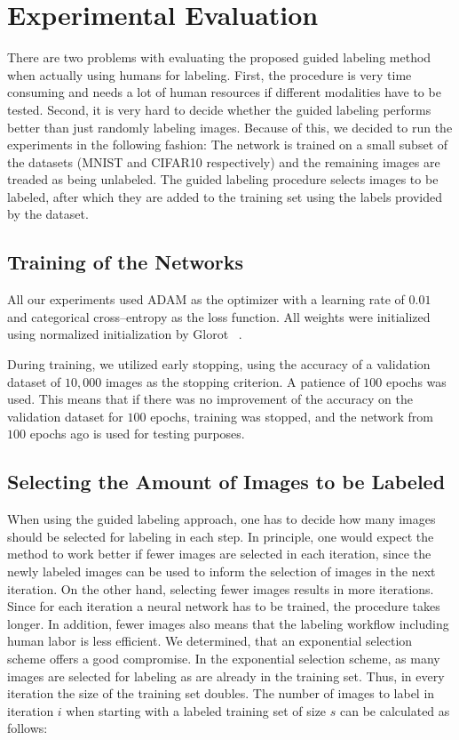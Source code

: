 \documentclass[10pt,twocolumn,letterpaper]{article}
\begin{document}
\section{Experimental Evaluation}
\label{sec-3}
There are two problems with evaluating the proposed guided labeling
method when actually using humans for labeling. First, the procedure
is very time consuming and needs a lot of human resources if different
modalities have to be tested. Second, it is very hard to decide
whether the guided labeling performs better than just randomly
labeling images. Because of this, we decided to run the experiments in
the following fashion: The network is trained on a small subset of the
datasets (MNIST and CIFAR10 respectively) and the remaining images are
treaded as being unlabeled. The guided labeling procedure selects
images to be labeled, after which they are added to the training set
using the labels provided by the dataset.

\subsection{Training of the Networks}
\label{sec-3-1}
All our experiments used ADAM \cite{kingma2014adam} as the optimizer
with a learning rate of $0.01$ and categorical cross--entropy as the
loss function. All weights were initialized using normalized
initialization by Glorot \etal~\cite{glorot2010understanding}.

During training, we utilized early stopping, using the accuracy of a
validation dataset of $10,000$ images as the stopping criterion. A
patience of $100$ epochs was used. This means that if there was no
improvement of the accuracy on the validation dataset for $100$
epochs, training was stopped, and the network from $100$ epochs ago is
used for testing purposes.
\subsection{Selecting the Amount of Images to be Labeled}
\label{sec-3-2}
When using the guided labeling approach, one has to decide how many
images should be selected for labeling in each step. In principle, one
would expect the method to work better if fewer images are selected in
each iteration, since the newly labeled images can be used to inform
the selection of images in the next iteration. On the other hand,
selecting fewer images results in more iterations. Since for each
iteration a neural network has to be trained, the procedure takes
longer. In addition, fewer images also means that the labeling
workflow including human labor is less efficient. We determined, that
an exponential selection scheme offers a good compromise. In the
exponential selection scheme, as many images are selected for labeling
as are already in the training set. Thus, in every iteration the size
of the training set doubles. The number of images to label in
iteration $i$ when starting with a labeled training set of size $s$
can be calculated as follows:
\end{document}
